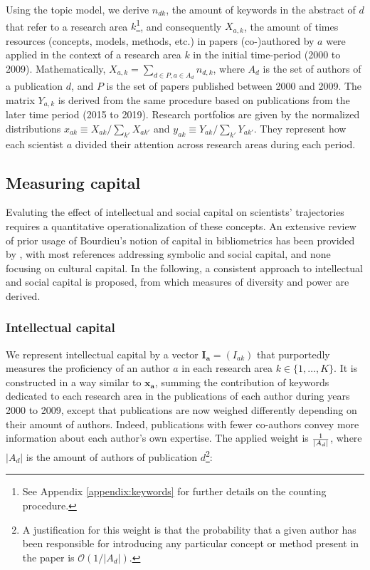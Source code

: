 \documentclass{article}
\begin{document}
Using the topic model, we derive $n_{dk}$, the amount of keywords in the abstract of $d$ that refer to a research area $k$\footnote{See Appendix \ref{appendix:keywords} for further details on the counting procedure.}, and consequently $X_{a,k}$, the amount of times resources (concepts, models, methods, etc.) in papers (co-)authored by $a$ were applied in the context of a research area $k$ in the initial time-period (2000 to 2009). Mathematically, $X_{a,k}=\sum_{d\in P,a\in A_d} n_{d,k}$, where $A_d$ is the set of authors of a publication $d$, and $P$ is the set of papers published between 2000 and 2009. The matrix $Y_{a,k}$ is derived from the same procedure based on publications from the later time period (2015 to 2019). Research portfolios are given by the normalized distributions $x_{ak} \equiv X_{ak}/\sum_{k'} X_{ak'}$ and $y_{ak} \equiv Y_{ak}/\sum_{k'} Y_{ak'}$. They represent how each scientist $a$ divided their attention across research areas during each period.

\subsection{\label{sec:capital}Measuring capital}

Evaluting the effect of intellectual and social capital on scientists' trajectories requires a quantitative operationalization of these concepts. An extensive review of prior usage of Bourdieu's notion of capital in bibliometrics has been provided by \citet[p.~198-200]{Schirone2023}, with most references addressing symbolic and social capital, and none focusing on cultural capital. In the following, a consistent approach to intellectual and social capital is proposed, from which measures of diversity and power are derived.

\subsubsection{Intellectual capital}

We represent intellectual capital by a vector $\bm{I_a}=(I_{ak})$ that purportedly measures the proficiency of an author $a$ in each research area $k \in \{1,\dots,K\}$. It is constructed in a way similar to $\bm{x_{a}}$, summing the contribution of keywords dedicated to each research area in the publications of each author during years 2000 to 2009, except that publications are now weighed differently depending on their amount of authors. Indeed, publications with fewer co-authors convey more information about each author's own expertise. The applied weight is $1 \over |A_d|$, where $|A_d|$ is the amount of authors of publication $d$\footnote{A justification for this weight is that the probability that a given author has been responsible for introducing any particular concept or method present in the paper is $\mathcal{O}(1/|A_d|)$. }:
\end{document}
